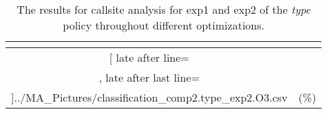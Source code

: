 \begin{table}[!htbp]
{\begin{tabular}{|c|c}
\multicolumn{1}{c}{}
	\\\midrule
	\csvreader[ late after line=\\, late after last line=\\\bottomrule]{../MA_Pictures/classification_comp2.type_exp2.O3.csv}{
}
	{\csvcoliv (\csvcolv \%) & \csvcolvi (\csvcolvii\%)}%


    	\end{tabular}
}
		\caption {The results for callsite analysis for exp1 and exp2 of the \textit{type} policy throughout different optimizations.}
		\label{tbl:CSexp12TYPE}
\end{table}


